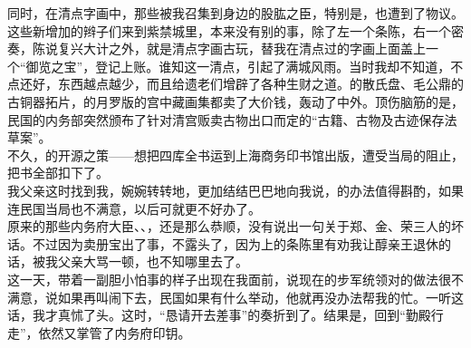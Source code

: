 同时，在清点字画中，那些被我召集到身边的股肱之臣，特别是，也遭到了物议。这些新增加的辫子们来到紫禁城里，本来没有别的事，除了左一个条陈，右一个密奏，陈说复兴大计之外，就是清点字画古玩，替我在清点过的字画上面盖上一个“御览之宝”，登记上账。谁知这一清点，引起了满城风雨。当时我却不知道，不点还好，东西越点越少，而且给遗老们增辟了各种生财之道。的散氏盘、毛公鼎的古铜器拓片，的月罗版的宫中藏画集都卖了大价钱，轰动了中外。顶伤脑筋的是，民国的内务部突然颁布了针对清宫贩卖古物出口而定的“古籍、古物及古迹保存法草案”。\\

不久，的开源之策——想把四库全书运到上海商务印书馆出版，遭受当局的阻止，把书全部扣下了。\\

我父亲这时找到我，婉婉转转地，更加结结巴巴地向我说，的办法值得斟酌，如果连民国当局也不满意，以后可就更不好办了。\\

原来的那些内务府大臣、、，还是那么恭顺，没有说出一句关于郑、金、荣三人的坏话。不过因为卖册宝出了事，不露头了，因为上的条陈里有劝我让醇亲王退休的话，被我父亲大骂一顿，也不知哪里去了。\\

这一天，带着一副胆小怕事的样子出现在我面前，说现在的步军统领对的做法很不满意，说如果再叫闹下去，民国如果有什么举动，他就再没办法帮我的忙。一听这话，我才真怵了头。这时，“恳请开去差事”的奏折到了。结果是，回到“勤殿行走”，依然又掌管了内务府印钥。
